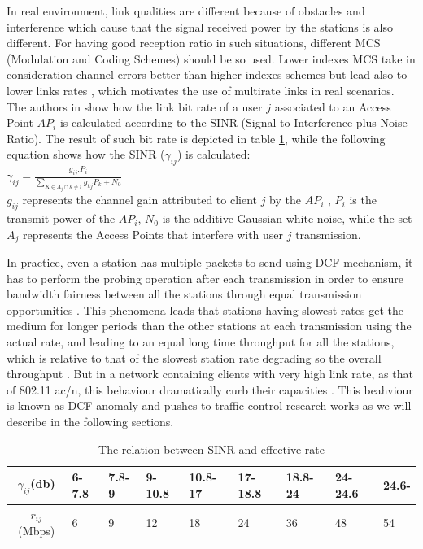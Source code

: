 \documentclass[journal,transmag]{IEEEtran}
\begin{document}
In real environment, link qualities are different because of obstacles and interference which cause that the signal received power by the stations is also different. For having good reception ratio in such situations, different MCS (Modulation and Coding Schemes) should be so used. Lower indexes MCS take in consideration channel errors better than higher indexes schemes but lead also to lower links rates \cite{16rigourous_practical_proportional_fair_AP,08AP_assignement_algorithms}, which motivates the use of multirate links in real scenarios. The authors in \cite{14AP_association_multirate_WLAN} show how the link bit rate of a user $j$ associated to an Access Point $AP_i$ is calculated according to the SINR (Signal-to-Interference-plus-Noise Ratio). The result of such bit rate is depicted in table \ref{SINR_rate}, while the following equation shows how the SINR ($\gamma_{ij}$) is calculated:\\
$\gamma_{ij}= \frac{g_{ij}. P_i}{\sum\limits_{K \in A_j\cap k \neq i} g_{kj} P_k + N_0}$ \\
$g_{ij}$ represents the channel gain attributed to client $j$ by the $AP_i$ , $P_i$ is the transmit power of the $AP_i$, $N_0$ is the additive Gaussian white noise, while the set $A_j$ represents the Access Points that interfere with user $j$ transmission.

In practice, even a station has multiple packets to send using DCF mechanism, it has to perform the probing operation after each transmission in order to ensure bandwidth fairness between all the stations through equal transmission opportunities \cite{16rigourous_practical_proportional_fair_AP}. This phenomena leads that stations having slowest rates get the medium for longer periods than the other stations at each transmission using the actual rate, and leading to an equal long time throughput for all the stations, which is relative to that of the slowest station rate degrading so the overall throughput \cite{03performance_anomaly_DCF,07optimal_association_MSWIM}. But in a network containing clients with very high link rate, as that of 802.11 ac/n, this behaviour dramatically curb their capacities \cite{16rigourous_practical_proportional_fair_AP}. This beahviour is known as DCF anomaly and pushes to traffic control research works as we will describe in the following sections.     

\begin{center} 
\begin{footnotesize}
\begin{table}[t]
\centering
\begin{tabular}{|c|l|l|l|l|l|l|l|l| } %
\hline
$\gamma_{ij}$(db) & 6-7.8 & 7.8-9 & 9-10.8 & 10.8-17 & 17-18.8 & 18.8-24 & 24-24.6 & 24.6- \\
\hline
$r_{ij}$ (Mbps) & 6 & 9 & 12 & 18 & 24 & 36 & 48 & 54  \\\hline


\hline
\end{tabular}
\label{SINR_rate}
\caption{The relation between SINR and effective rate}
\end{table}
\end{footnotesize}
\end{center}
\end{document}
